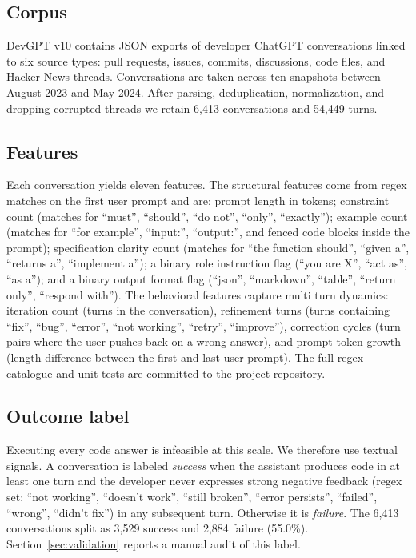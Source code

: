\documentclass[conference]{IEEEtran}
\begin{document}
\subsection{Corpus}
DevGPT v10 \cite{xiao2023devgpt} contains JSON exports of developer ChatGPT conversations linked to six source types: pull requests, issues, commits, discussions, code files, and Hacker News threads. Conversations are taken across ten snapshots between August 2023 and May 2024. After parsing, deduplication, normalization, and dropping corrupted threads we retain 6,413 conversations and 54,449 turns.

\subsection{Features}
Each conversation yields eleven features. The structural features come from regex matches on the first user prompt and are: prompt length in tokens; constraint count (matches for ``must'', ``should'', ``do not'', ``only'', ``exactly''); example count (matches for ``for example'', ``input:'', ``output:'', and fenced code blocks inside the prompt); specification clarity count (matches for ``the function should'', ``given a'', ``returns a'', ``implement a''); a binary role instruction flag (``you are X'', ``act as'', ``as a''); and a binary output format flag (``json'', ``markdown'', ``table'', ``return only'', ``respond with''). The behavioral features capture multi turn dynamics: iteration count (turns in the conversation), refinement turns (turns containing ``fix'', ``bug'', ``error'', ``not working'', ``retry'', ``improve''), correction cycles (turn pairs where the user pushes back on a wrong answer), and prompt token growth (length difference between the first and last user prompt). The full regex catalogue and unit tests are committed to the project repository.

\subsection{Outcome label}
Executing every code answer is infeasible at this scale. We therefore use textual signals. A conversation is labeled \emph{success} when the assistant produces code in at least one turn and the developer never expresses strong negative feedback (regex set: ``not working'', ``doesn't work'', ``still broken'', ``error persists'', ``failed'', ``wrong'', ``didn't fix'') in any subsequent turn. Otherwise it is \emph{failure}. The 6,413 conversations split as 3,529 success and 2,884 failure (55.0\%). Section~\ref{sec:validation} reports a manual audit of this label.
\end{document}
